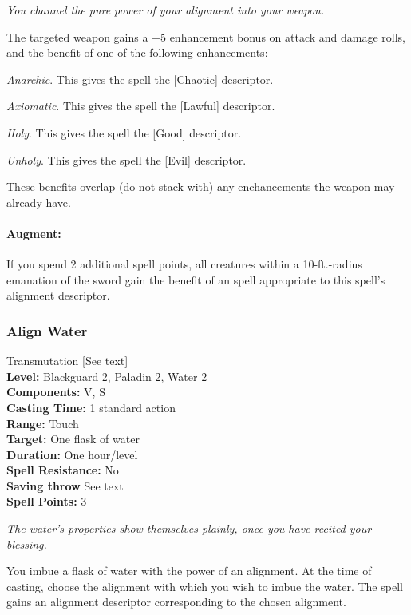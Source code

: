 \emph{You channel the pure power of your alignment into your weapon.}

The targeted weapon gains a +5 enhancement bonus on attack and damage rolls, and the benefit of one of the following enhancements:
\begin{list}{}{\leftmargin=1em}
 \item \emph{Anarchic}. This gives the spell the [Chaotic] descriptor.
 \item \emph{Axiomatic}. This gives the spell the [Lawful] descriptor.
 \item \emph{Holy}. This gives the spell the [Good] descriptor.
 \item \emph{Unholy}. This gives the spell the [Evil] descriptor.
\end{list}

These benefits overlap (do not stack with) any enchancements the weapon may already have.

\paragraph{Augment:} If you spend 2 additional spell points, all creatures within a 10-ft.-radius emanation of the sword
gain the benefit of an  spell appropriate to this spell's alignment descriptor.
\subsubsection{Align Water}
\label{Spell:AlignWater}
Transmutation [See text]
\\ \textbf{Level:} Blackguard 2, Paladin 2, Water 2
\\ \textbf{Components:} V, S
\\ \textbf{Casting Time:} 1 standard action
\\ \textbf{Range:} Touch
\\ \textbf{Target:} One flask of water
\\ \textbf{Duration:} One hour/level
\\ \textbf{Spell Resistance:} No
\\ \textbf{Saving throw} See text
\\ \textbf{Spell Points:} 3

\emph{The water's properties show themselves plainly, once you have recited your blessing.}

You imbue a flask of water with the power of an alignment.
At the time of casting, choose the alignment with which you wish to imbue the water.
The spell gains an alignment descriptor corresponding to the chosen alignment.

